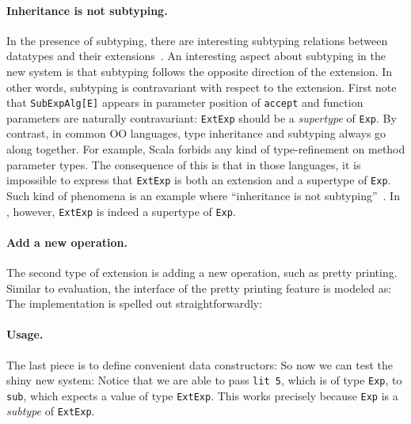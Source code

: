 \paragraph{Inheritance is not subtyping.} In the presence of subtyping, there
are interesting subtyping relations between datatypes and their
extensions~\cite{oliveira09modular}. An interesting aspect about subtyping in
the new system is that subtyping follows the opposite direction of the
extension. In other words, subtyping is contravariant with respect to the
extension. First note that \lstinline{SubExpAlg[E]} appears in parameter
position of \lstinline{accept} and function parameters are naturally
contravariant: \lstinline{ExtExp} should be a \textit{supertype} of
\lstinline{Exp}. By contrast, in common OO languages, type inheritance and
subtyping always go along together. For example, Scala forbids any kind of
type-refinement on method parameter types. The consequence of this is that in
those languages, it is impossible to express that \lstinline{ExtExp} is both an
extension and a supertype of \lstinline{Exp}. Such kind of phenomena is an
example where ``inheritance is not
subtyping''~\cite{cook1989inheritance}. In \name, however,
\lstinline{ExtExp} is indeed a supertype of \lstinline{Exp}.

\paragraph{Add a new operation.} The second type of extension is adding a new
operation, such as pretty printing. Similar to evaluation, the interface of the
pretty printing feature is modeled as:
The implementation is spelled out straightforwardly:

\paragraph{Usage.} The last piece is to define convenient data constructors:
So now we can test the shiny new system:
Notice that we are able to pass \lstinline{lit 5}, which is of type
\lstinline{Exp}, to \lstinline{sub}, which expects a value of type
\lstinline{ExtExp}. This works precisely because \lstinline{Exp} is a
\textit{subtype} of \lstinline{ExtExp}.


